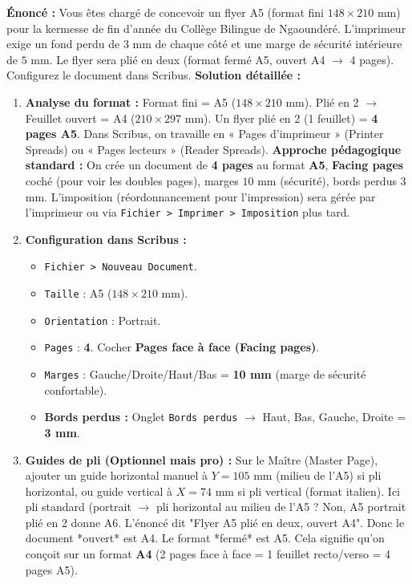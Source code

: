 \documentclass[11pt]{article}
\begin{document}
\begin{exoresolu}
    \textbf{Énoncé :} Vous êtes chargé de concevoir un flyer A5 (format fini $148 \times 210$ mm) pour la kermesse de fin d'année du Collège Bilingue de Ngaoundéré. L'imprimeur exige un fond perdu de $3$ mm de chaque côté et une marge de sécurité intérieure de $5$ mm. Le flyer sera plié en deux (format fermé A5, ouvert A4 $\rightarrow$ 4 pages). Configurez le document dans Scribus.
    \tcblower
    \textbf{Solution détaillée :}
    \begin{enumerate}
        \item \textbf{Analyse du format :} Format fini = A5 ($148 \times 210$ mm). Plié en 2 $\rightarrow$ Feuillet ouvert = A4 ($210 \times 297$ mm). Un flyer plié en 2 (1 feuillet) = \textbf{4 pages A5}. Dans Scribus, on travaille en « Pages d'imprimeur » (Printer Spreads) ou « Pages lecteurs » (Reader Spreads). \textbf{Approche pédagogique standard :} On crée un document de \textbf{4 pages} au format \textbf{A5}, \textbf{Facing pages} coché (pour voir les doubles pages), marges $10$ mm (sécurité), bords perdus $3$ mm. L'imposition (réordonnancement pour l'impression) sera gérée par l'imprimeur ou via \texttt{Fichier > Imprimer > Imposition} plus tard.
        \item \textbf{Configuration dans Scribus :}
              \begin{itemize}
                  \item \texttt{Fichier > Nouveau Document}.
                  \item \texttt{Taille} : A5 ($148 \times 210$ mm).
                  \item \texttt{Orientation} : Portrait.
                  \item \texttt{Pages} : \textbf{4}. Cocher \textbf{Pages face à face (Facing pages)}.
                  \item \texttt{Marges} : Gauche/Droite/Haut/Bas = \textbf{10 mm} (marge de sécurité confortable).
                  \item \textbf{Bords perdus :} Onglet \texttt{Bords perdus} $\rightarrow$ Haut, Bas, Gauche, Droite = \textbf{3 mm}.
              \end{itemize}
        \item \textbf{Guides de pli (Optionnel mais pro) :} Sur le Maître (Master Page), ajouter un guide horizontal manuel à $Y = 105$ mm (milieu de l'A5) si pli horizontal, ou guide vertical à $X = 74$ mm si pli vertical (format italien). Ici pli standard (portrait $\rightarrow$ pli horizontal au milieu de l'A5 ? Non, A5 portrait plié en 2 donne A6. L'énoncé dit "Flyer A5 plié en deux, ouvert A4". Donc le document *ouvert* est A4. Le format *fermé* est A5. Cela signifie qu'on conçoit sur un format \textbf{A4} (2 pages face à face = 1 feuillet recto/verso = 4 pages A5).

\end{enumerate}
\end{exoresolu}
\end{document}
